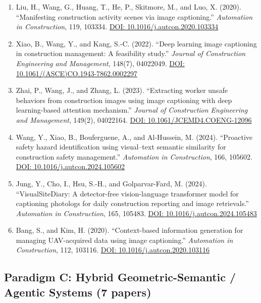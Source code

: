 \documentclass[11pt]{article}
\begin{document}
\begin{enumerate}[label=\textbf{B\arabic*.}]

\item Liu, H., Wang, G., Huang, T., He, P., Skitmore, M., and Luo, X. (2020). ``Manifesting construction activity scenes via image captioning.'' \textit{Automation in Construction}, 119, 103334. \href{https://doi.org/10.1016/j.autcon.2020.103334}{DOI: 10.1016/j.autcon.2020.103334}

\item Xiao, B., Wang, Y., and Kang, S.-C. (2022). ``Deep learning image captioning in construction management: A feasibility study.'' \textit{Journal of Construction Engineering and Management}, 148(7), 04022049. \href{https://doi.org/10.1061/(ASCE)CO.1943-7862.0002297}{DOI: 10.1061/(ASCE)CO.1943-7862.0002297}

\item Zhai, P., Wang, J., and Zhang, L. (2023). ``Extracting worker unsafe behaviors from construction images using image captioning with deep learning-based attention mechanism.'' \textit{Journal of Construction Engineering and Management}, 149(2), 04022164. \href{https://doi.org/10.1061/JCEMD4.COENG-12096}{DOI: 10.1061/JCEMD4.COENG-12096}

\item Wang, Y., Xiao, B., Bouferguene, A., and Al-Hussein, M. (2024). ``Proactive safety hazard identification using visual--text semantic similarity for construction safety management.'' \textit{Automation in Construction}, 166, 105602. \href{https://doi.org/10.1016/j.autcon.2024.105602}{DOI: 10.1016/j.autcon.2024.105602}

\item Jung, Y., Cho, I., Hsu, S.-H., and Golparvar-Fard, M. (2024). ``VisualSiteDiary: A detector-free vision-language transformer model for captioning photologs for daily construction reporting and image retrievals.'' \textit{Automation in Construction}, 165, 105483. \href{https://doi.org/10.1016/j.autcon.2024.105483}{DOI: 10.1016/j.autcon.2024.105483}

\item Bang, S., and Kim, H. (2020). ``Context-based information generation for managing UAV-acquired data using image captioning.'' \textit{Automation in Construction}, 112, 103116. \href{https://doi.org/10.1016/j.autcon.2020.103116}{DOI: 10.1016/j.autcon.2020.103116}

\end{enumerate}

\subsection{Paradigm C: Hybrid Geometric-Semantic / Agentic Systems (7 papers)}
\end{document}
